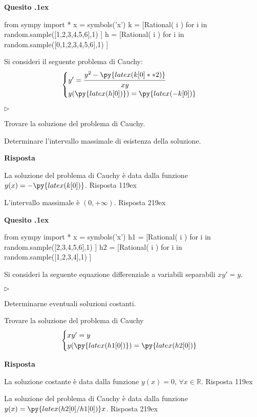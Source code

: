 \documentclass[11pt,twoside,a4paper]{article}
\newcommand{\mylabel}[1]{#1\hfill}
\renewenvironment{itemize}
  {\begin{list}{$\triangleright$}{%
   \setlength{\parskip}{0mm}
   \setlength{\topsep}{.4\baselineskip}
   \setlength{\rightmargin}{0mm}
   \setlength{\listparindent}{0mm}
   \setlength{\itemindent}{0mm}
   \setlength{\labelwidth}{2ex}
   \setlength{\itemsep}{.4\baselineskip}
   \setlength{\parsep}{0mm}
   \setlength{\partopsep}{0mm}
   \setlength{\labelsep}{1ex}
   \setlength{\leftmargin}{\labelwidth+\labelsep}
   \let\makelabel\mylabel}}{%
   \end{list}\vspace*{-1.3mm}}
\newcounter{quesito}
\newenvironment{question}{\bigskip\addtocounter{quesito}{1}\bigskip\bigskip\par\textbf{Quesito \thequesito.\kern1ex}}{\vspace{\parskip}}
\newenvironment{answer}{\par\textbf{Risposta\quad}}{\vspace{\parskip}}
\begin{document}
\begin{question}
\begin{pycode}
from sympy import *
x = symbols('x')
k = [Rational( i ) for i in random.sample([1,2,3,4,5,6],1) ]
h = [Rational( i ) for i in random.sample([0,1,2,3,4,5,6],1) ]
\end{pycode}
Si consideri il seguente problema di Cauchy:
\[\begin{cases} y' = \cfrac{y^2 - \py{latex(k[0]**2)}}{xy} \cr y(\py{latex(h[0])}) = \py{latex(-k[0])} \end{cases}\]
\begin{itemize}
\item[1.] Trovare la soluzione del problema di Cauchy.
\item[2.] Determinare l'intervallo massimale di esistenza della soluzione.

\end{itemize}
\begin{answer}

{\color{blue}
La soluzione del problema di Cauchy \`e data dalla funzione $y(x) = -\py{latex(k[0])}$.
\hfill Risposta 1\kern19ex}

\smallskip
{\color{blue} L'intervallo massimale \`e $(0, +\infty)$.
\hfill Risposta 2\kern19ex}

\end{answer}
\end{question}
\begin{question}
\begin{pycode}
from sympy import *
x = symbols('x')
h1 = [Rational( i ) for i in random.sample([2,3,4,5,6],1) ]
h2 = [Rational( i ) for i in random.sample([1,2,3,4],1) ]
\end{pycode}
Si consideri la seguente equazione differenziale a variabili separabili \(xy' = y\).
\begin{itemize}
\item[1.] Determinarne eventuali soluzioni costanti.
\item[2.] Trovare la soluzione del problema di Cauchy
\[\begin{cases} xy' = y \cr y(\py{latex(h1[0])}) = \py{latex(h2[0])}  \end{cases}\]
\end{itemize}
\begin{answer}

{\color{blue}
La soluzione costante \`e data dalla funzione $y(x) = 0$, $\forall x \in \mathbb R$.
\hfill Risposta 1\kern19ex}

\smallskip
{\color{blue} La soluzione del problema di Cauchy \`e data dalla funzione $y(x) = \py{latex(h2[0]/h1[0])}x$.
\hfill Risposta 2\kern19ex}

\end{answer}
\end{question}
\end{document}
